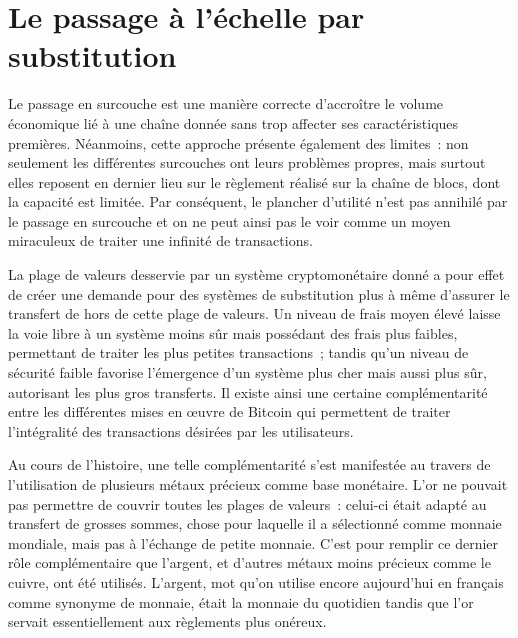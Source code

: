 
\section*{Le passage à l'échelle par substitution}

Le passage en surcouche est une manière correcte d'accroître le volume économique lié à une chaîne donnée sans trop affecter ses caractéristiques premières. Néanmoins, cette approche présente également des limites~: non seulement les différentes surcouches ont leurs problèmes propres, mais surtout elles reposent en dernier lieu sur le règlement réalisé sur la chaîne de blocs, dont la capacité est limitée. Par conséquent, le plancher d'utilité n'est pas annihilé par le passage en surcouche et on ne peut ainsi pas le voir comme un moyen miraculeux de traiter une infinité de transactions.

La plage de valeurs desservie par un système cryptomonétaire donné a pour effet de créer une demande pour des systèmes de substitution plus à même d'assurer le transfert de hors de cette plage de valeurs. Un niveau de frais moyen élevé laisse la voie libre à un système moins sûr mais possédant des frais plus faibles, permettant de traiter les plus petites transactions~; tandis qu'un niveau de sécurité faible favorise l'émergence d'un système plus cher mais aussi plus sûr, autorisant les plus gros transferts. Il existe ainsi une certaine complémentarité entre les différentes mises en œuvre de Bitcoin qui permettent de traiter l'intégralité des transactions désirées par les utilisateurs.

Au cours de l'histoire, une telle complémentarité s'est manifestée au travers de l'utilisation de plusieurs métaux précieux comme base monétaire. L'or ne pouvait pas permettre de couvrir toutes les plages de valeurs~: celui-ci était adapté au transfert de grosses sommes, chose pour laquelle il a sélectionné comme monnaie mondiale, mais pas à l'échange de petite monnaie. C'est pour remplir ce dernier rôle complémentaire que l'argent, et d'autres métaux moins précieux comme le cuivre, ont été utilisés. L'argent, mot qu'on utilise encore aujourd'hui en français comme synonyme de monnaie, était la monnaie du quotidien tandis que l'or servait essentiellement aux règlements plus onéreux.


